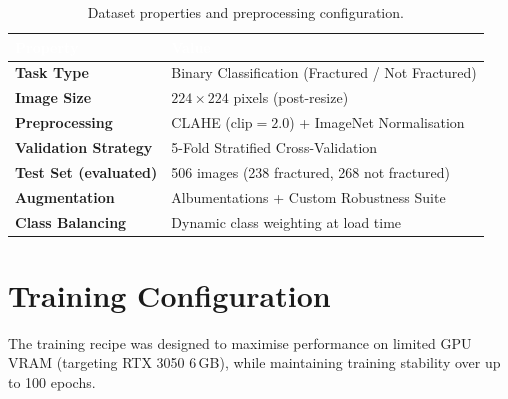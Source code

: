 \documentclass[12pt, a4paper]{article}
\begin{document}
\begin{table}[H]
\centering
\caption{Dataset properties and preprocessing configuration.}
\label{tab:dataset}
\begin{tabularx}{\textwidth}{>{\bfseries}lX}
\toprule
\rowcolor{NavyBlue}
\textcolor{white}{Property} & \textcolor{white}{Value} \\
\midrule
Task Type             & Binary Classification (Fractured / Not Fractured) \\
Image Size            & $224 \times 224$ pixels (post-resize) \\
Preprocessing         & CLAHE (clip$=2.0$) + ImageNet Normalisation \\
Validation Strategy   & 5-Fold Stratified Cross-Validation \\
Test Set (evaluated)  & 506 images (238 fractured, 268 not fractured) \\
Augmentation          & Albumentations + Custom Robustness Suite \\
Class Balancing       & Dynamic class weighting at load time \\
\bottomrule
\end{tabularx}
\end{table}

\section{Training Configuration}

The training recipe was designed to maximise performance on limited GPU VRAM (targeting RTX
3050 6\,GB), while maintaining training stability over up to 100 epochs.
\end{document}
